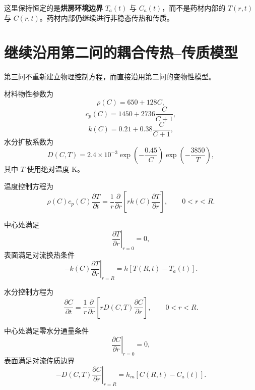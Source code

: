 \documentclass[UTF8,a4paper,12pt]{ctexart}
\begin{document}
这里保持恒定的是\textbf{烘房环境边界} $T_a(t)$ 与 $C_a(t)$，而不是药材内部的
$T(r,t)$ 与 $C(r,t)$。药材内部仍继续进行非稳态传热和传质。

\section{继续沿用第二问的耦合传热--传质模型}

第三问不重新建立物理控制方程，而直接沿用第二问的变物性模型。

材料物性参数为
\begin{equation}
    \rho(C)=650+128C,
\end{equation}
\begin{equation}
    c_p(C)=1450+2736\frac{C}{C+1},
\end{equation}
\begin{equation}
    k(C)=0.21+0.38\frac{C}{C+1},
\end{equation}
水分扩散系数为
\begin{equation}
    D(C,T)
    =
    2.4\times10^{-3}
    \exp\!\left(-\frac{0.45}{C}\right)
    \exp\!\left(-\frac{3850}{T}\right),
    \label{eq:D}
\end{equation}
其中 $T$ 使用绝对温度 K。

温度控制方程为
\begin{equation}
    \rho(C)c_p(C)\frac{\partial T}{\partial t}
    =
    \frac{1}{r}
    \frac{\partial}{\partial r}
    \left[
        rk(C)\frac{\partial T}{\partial r}
    \right],
    \qquad 0<r<R.
    \label{eq:heat}
\end{equation}

中心处满足
\begin{equation}
    \left.
    \frac{\partial T}{\partial r}
    \right|_{r=0}=0,
\end{equation}
表面满足对流换热条件
\begin{equation}
    -k(C)
    \left.
    \frac{\partial T}{\partial r}
    \right|_{r=R}
    =
    h\left[T(R,t)-T_a(t)\right].
    \label{eq:heat_bc}
\end{equation}

水分控制方程为
\begin{equation}
    \frac{\partial C}{\partial t}
    =
    \frac{1}{r}
    \frac{\partial}{\partial r}
    \left[
        rD(C,T)\frac{\partial C}{\partial r}
    \right],
    \qquad 0<r<R.
    \label{eq:moisture}
\end{equation}

中心处满足零水分通量条件
\begin{equation}
    \left.
    \frac{\partial C}{\partial r}
    \right|_{r=0}=0,
\end{equation}
表面满足对流传质边界
\begin{equation}
    -D(C,T)
    \left.
    \frac{\partial C}{\partial r}
    \right|_{r=R}
    =
    h_m\left[C(R,t)-C_a(t)\right].
    \label{eq:moisture_bc}
\end{equation}
\end{document}
